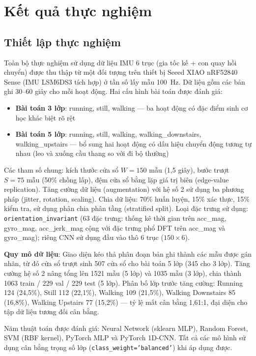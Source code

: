 \chapter{Kết quả thực nghiệm}
\label{chap:results}

\section{Thiết lập thực nghiệm}
\label{sec:experimental_setup}

Toàn bộ thực nghiệm sử dụng dữ liệu IMU 6 trục (gia tốc kế + con quay hồi chuyển) được thu thập từ một đối tượng trên thiết bị Seeed XIAO nRF52840 Sense (IMU LSM6DS3 tích hợp) ở tần số lấy mẫu 100~Hz. Dữ liệu gồm các bản ghi 30--60 giây cho mỗi hoạt động. Hai cấu hình bài toán được đánh giá:
\begin{itemize}
    \item \textbf{Bài toán 3 lớp}: running, still, walking --- ba hoạt động có đặc điểm sinh cơ học khác biệt rõ rệt
    \item \textbf{Bài toán 5 lớp}: running, still, walking, walking\_downstairs, walking\_upstairs --- bổ sung hai hoạt động có dấu hiệu chuyển động tương tự nhau (leo và xuống cầu thang so với đi bộ thường)
\end{itemize}

Các tham số chung: kích thước cửa sổ $W = 150$ mẫu (1,5 giây), bước trượt $S = 75$ mẫu (50\% chồng lấp), đệm cửa sổ bằng lặp giá trị biên (edge-value replication). Tăng cường dữ liệu (augmentation) với hệ số 2 sử dụng ba phương pháp (jitter, rotation, scaling). Chia dữ liệu: 70\% huấn luyện, 15\% xác thực, 15\% kiểm tra, sử dụng phân chia phân tầng (stratified split). Loại đặc trưng sử dụng: \texttt{orientation\_invariant} (63 đặc trưng: thống kê thời gian trên acc\_mag, gyro\_mag, acc\_jerk\_mag cộng với đặc trưng phổ DFT trên acc\_mag và gyro\_mag); riêng CNN sử dụng đầu vào thô 6 trục ($150 \times 6$).

\textbf{Quy mô dữ liệu}: Giao diện kéo thả phân đoạn bản ghi thành các mẫu được gán nhãn, từ đó cửa sổ trượt sinh 507 cửa sổ cho bài toán 5 lớp (345 cho 3 lớp). Tăng cường hệ số 2 nâng tổng lên 1521 mẫu (5 lớp) và 1035 mẫu (3 lớp), chia thành 1063 train / 229 val / 229 test (5 lớp). Phân bố lớp trước tăng cường: Running 124 (24,5\%), Still 112 (22,1\%), Walking 109 (21,5\%), Walking Downstairs 85 (16,8\%), Walking Upstairs 77 (15,2\%) --- tỷ lệ mất cân bằng 1,61:1, đại diện cho tập dữ liệu tương đối cân bằng.

Năm thuật toán được đánh giá: Neural Network (sklearn MLP), Random Forest, SVM (RBF kernel), PyTorch MLP và PyTorch 1D-CNN. Tất cả các mô hình sử dụng cân bằng trọng số lớp (\texttt{class\_weight='balanced'}) khi áp dụng được.

